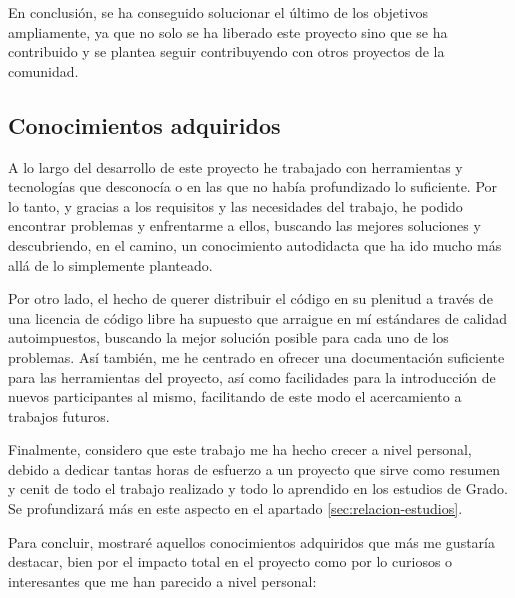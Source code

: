 \documentclass[11pt,spanish,listoffigures]{tfgetsinf}
\begin{document}
En conclusión, se ha conseguido solucionar el último de los objetivos ampliamente, ya que no solo se ha liberado este proyecto sino que se ha contribuido y se plantea seguir contribuyendo con otros proyectos de la comunidad.

\subsection{Conocimientos adquiridos}

A lo largo del desarrollo de este proyecto he trabajado con herramientas y tecnologías que desconocía o en las que no había profundizado lo suficiente. Por lo tanto, y gracias a los requisitos y las necesidades del trabajo, he podido encontrar problemas y enfrentarme a ellos, buscando las mejores soluciones y descubriendo, en el camino, un conocimiento autodidacta que ha ido mucho más allá de lo simplemente planteado.

Por otro lado, el hecho de querer distribuir el código en su plenitud a través de una licencia de código libre ha supuesto que arraigue en mí estándares de calidad autoimpuestos, buscando la mejor solución posible para cada uno de los problemas. Así también, me he centrado en ofrecer una documentación suficiente para las herramientas del proyecto, así como facilidades para la introducción de nuevos participantes al mismo, facilitando de este modo el acercamiento a trabajos futuros.

Finalmente, considero que este trabajo me ha hecho crecer a nivel personal, debido a dedicar tantas horas de esfuerzo a un proyecto que sirve como resumen y cenit de todo el trabajo realizado y todo lo aprendido en los estudios de Grado. Se profundizará más en este aspecto en el apartado \ref{sec:relacion-estudios}. 

Para concluir, mostraré aquellos conocimientos adquiridos que más me gustaría destacar, bien por el impacto total en el proyecto como por lo curiosos o interesantes que me han parecido a nivel personal:
\end{document}
